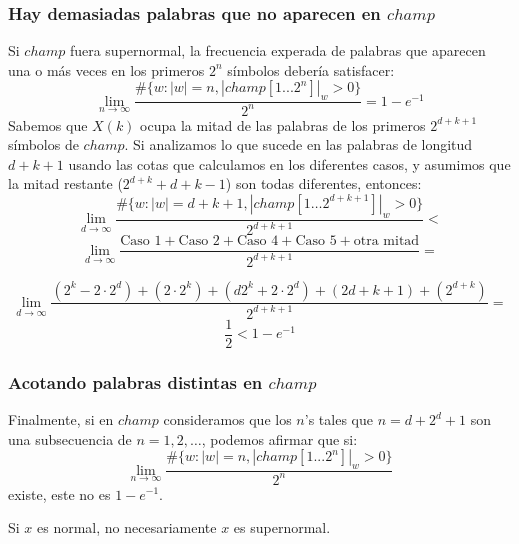 \documentclass[10pt,mathserif]{beamer}%
\begin{document}
\begin{frame}
  \frametitle{Hay demasiadas palabras que no aparecen en $champ$}
  Si $champ$ fuera supernormal, la frecuencia experada de palabras que aparecen una o más veces en los primeros $2^n$ símbolos debería satisfacer:
$$\lim_{n\to\infty} \frac{\#\{w: |w| = n  , |champ[1...2^n]|_w > 0\}}{2^n}  = 1 - e^{-1}$$
\pause
Sabemos que $X(k)$ ocupa la mitad de las palabras de los primeros $2^{d+k+1}$ símbolos de $champ$.
Si analizamos lo que sucede en las palabras de longitud $d+k+1$ usando las cotas que calculamos en los diferentes casos, y asumimos que la mitad restante ($2^{d+k} + d + k - 1$) son todas diferentes, entonces:
  $$\lim_{d\to\infty} \frac{\#\{w : |w| = d+k+1, |champ[1 \dots 2^{d+k+1}]|_w > 0 \}}{2^{d+k+1}} <$$
  $$\lim_{d\to\infty} \frac{ \textrm{Caso 1} + \textrm{Caso 2}+ \textrm{Caso 4} + \textrm{Caso 5} + \textrm{otra mitad}}{2^{d+k+1}} =$$

  \pause 

    $$\lim_{d\to\infty} \frac{(2^k - 2\cdot 2^d) + (2 \cdot 2^k)+ (d2^k + 2 \cdot 2^d) + (2d+k+1) + (2^{d+k}) }{2^{d+k+1}} =$$
    $$\frac{1}{2} < 1 - e^{-1}$$

\end{frame}

\begin{frame}
  \frametitle{Acotando palabras distintas en $champ$}
  Finalmente, si en $champ$ consideramos que los $n$'s tales que $n = d + 2^d + 1$ son una subsecuencia de $n=1,2,\dots$, podemos afirmar que si:
  $$\lim_{n\to\infty} \frac{\#\{w: |w| = n  , |champ[1...2^n]|_w > 0\}}{2^n}$$
  existe, este no es $1 - e^{-1}$.

\begin{corollary}
Si $x$ es normal, no necesariamente $x$ es supernormal.
\end{corollary}
\end{frame}


 
\end{document}
